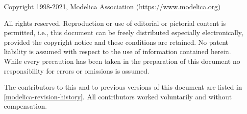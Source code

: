 Copyright \textcopyright{} 1998-2021, Modelica Association (\url{https://www.modelica.org})

All rights reserved.
Reproduction or use of editorial or pictorial content is permitted, i.e., this document can be freely distributed especially electronically, provided the copyright notice and these conditions are retained.
No patent liability is assumed with respect to the use of information contained herein.
While every precaution has been taken in the preparation of this document no responsibility for errors or omissions is assumed.

The contributors to this and to previous versions of this document are listed in \cref{modelica-revision-history}.
All contributors worked voluntarily and without compensation.

